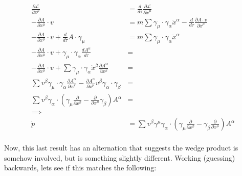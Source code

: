 \documentclass{article}
\begin{document}
\begin{align*}
\frac{\partial \mathcal{L}}{\partial x^{\mu}} &= \frac{d}{d\tau} \frac{\partial \mathcal{L}}{\partial \dot{x}^{\mu}} \\
-\frac{\partial A}{\partial x^{\mu}} \cdot v &= m \sum \gamma_{\mu} \cdot \gamma_{\alpha} \ddot{x}^{\alpha} -\frac{d}{d\tau} \frac{\partial A \cdot v}{\partial \dot{x}^{\mu}} \\
-\frac{\partial A}{\partial x^{\mu}} \cdot v +\frac{d}{d\tau} A \cdot \gamma_{\mu} &= m \sum \gamma_{\mu} \cdot \gamma_{\alpha} \ddot{x}^{\alpha} \\
-\frac{\partial A}{\partial x^{\mu}} \cdot v + \gamma_{\mu} \cdot \gamma_{\alpha} \frac{d A^{\alpha}}{d\tau} &= \\
-\frac{\partial A}{\partial x^{\mu}} \cdot v + \sum \gamma_{\mu} \cdot \gamma_{\alpha} \dot{x}^{\beta} \frac{\partial A^{\alpha}}{\partial x^{\beta}} &= \\
\sum v^{\beta} \gamma_{\mu} \cdot \gamma_{\alpha} \frac{\partial A^{\alpha}}{\partial x^{\beta}} - \frac{\partial A^{\alpha}}{\partial x^{\mu}} {v}^{\beta} \gamma_{\alpha} \cdot \gamma_{\beta} &= \\
\sum v^{\beta} \gamma_{\alpha} \cdot \left( \gamma_{\mu} \frac{\partial}{\partial x^{\beta}} - \frac{\partial}{\partial x^{\mu}} \gamma_{\beta} \right) A^{\alpha} &= \\
\implies \\
\dot{p} &= 
\sum v^{\beta} \gamma^{\mu} \gamma_{\alpha} \cdot \left( \gamma_{\mu} \frac{\partial}{\partial x^{\beta}} - \gamma_{\beta} \frac{\partial}{\partial x^{\mu}} \right) A^{\alpha} 
\\
\end{align*}

Now, this last result has an alternation that suggests the wedge product is somehow involved, but is something slightly different.  Working (guessing) backwards, lets
see if this matches the following:
\end{document}
